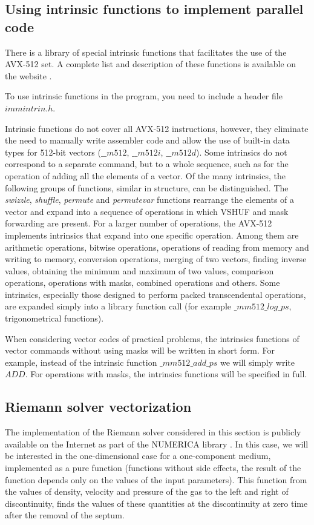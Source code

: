 \documentclass[
11pt,%
tightenlines,%
twoside,%
onecolumn,%
nofloats,%
nobibnotes,%
nofootinbib,%
superscriptaddress,%
noshowpacs,%
centertags]%
{revtex4}
\begin{document}
\subsection{Using intrinsic functions to implement parallel code}

There is a library of special intrinsic functions that facilitates the use of the AVX-512 set. A complete list and description of these functions is available on the website \cite{Intel_Intr}.

To use intrinsic functions in the program, you need to include a header file $immintrin.h$.

Intrinsic functions do not cover all AVX-512 instructions, however, they eliminate the need to manually write assembler code and allow the use of built-in data types for 512-bit vectors ($\_\_m512$, $\_\_m512i$, $\_\_m512d$).
Some intrinsics do not correspond to a separate command, but to a whole sequence, such as for the operation of adding all the elements of a vector.
Of the many intrinsics, the following groups of functions, similar in structure, can be distinguished.
The \textit{swizzle}, \textit{shuffle}, \textit{permute} and \textit{permutevar} functions rearrange the elements of a vector and expand into a sequence of operations in which VSHUF and mask forwarding are present.
For a larger number of operations, the AVX-512 implements intrinsics that expand into one specific operation.
Among them are arithmetic operations, bitwise operations, operations of reading from memory and writing to memory, conversion operations, merging of two vectors, finding inverse values, obtaining the minimum and maximum of two values, comparison operations, operations with masks, combined operations and others.
Some intrinsics, especially those designed to perform packed transcendental operations, are expanded simply into a library function call (for example $\_mm512\_log\_ps$, trigonometrical functions).

When considering vector codes of practical problems, the intrinsics functions of vector commands without using masks will be written in short form.
For example, instead of the intrinsic function $\_mm512\_add\_ps$ we will simply write $ADD$.
For operations with masks, the intrinsics functions will be specified in full.

\subsection{Riemann solver vectorization}

The implementation of the Riemann solver considered in this section is publicly available on the Internet as part of the NUMERICA library \cite{Numerica}.
In this case, we will be interested in the one-dimensional case for a one-component medium, implemented as a pure function (functions without side effects, the result of the function depends only on the values of the input parameters).
This function from the values of density, velocity and pressure of the gas to the left and right of discontinuity, finds the values of these quantities at the discontinuity at zero time after the removal of the septum.
\end{document}

